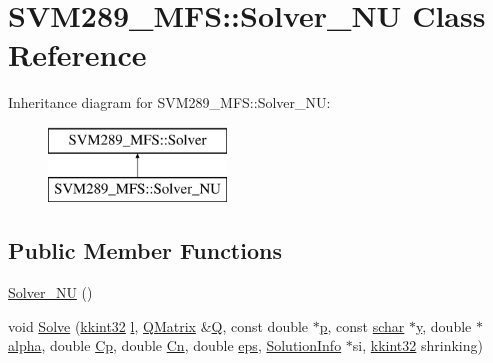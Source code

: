 \hypertarget{class_s_v_m289___m_f_s_1_1_solver___n_u}{}\section{S\+V\+M289\+\_\+\+M\+FS\+:\+:Solver\+\_\+\+NU Class Reference}
\label{class_s_v_m289___m_f_s_1_1_solver___n_u}
Inheritance diagram for S\+V\+M289\+\_\+\+M\+FS\+:\+:Solver\+\_\+\+NU\+:\begin{figure}[H]
\begin{center}
\leavevmode
\includegraphics[height=2.000000cm]{class_s_v_m289___m_f_s_1_1_solver___n_u}
\end{center}
\end{figure}
\subsection*{Public Member Functions}
\begin{DoxyCompactItemize}
\item 
\hyperlink{class_s_v_m289___m_f_s_1_1_solver___n_u_a2c623aebb6d4e9a955d24c313e854c68}{Solver\+\_\+\+NU} ()
\item 
void \hyperlink{class_s_v_m289___m_f_s_1_1_solver___n_u_a64010900d959a38e7385332c9e8b1790}{Solve} (\hyperlink{namespace_k_k_b_a8fa4952cc84fda1de4bec1fbdd8d5b1b}{kkint32} \hyperlink{class_s_v_m289___m_f_s_1_1_solver_a3b58f02675a93b7f559946c731beebd5}{l}, \hyperlink{class_s_v_m289___m_f_s_1_1_q_matrix}{Q\+Matrix} \&\hyperlink{class_s_v_m289___m_f_s_1_1_solver_a5655aaf1c92b609e8ed2087e08b053eb}{Q}, const double $\ast$\hyperlink{class_s_v_m289___m_f_s_1_1_solver_aee0ff21847e331b59d7a929b3c813b94}{p}, const \hyperlink{namespace_s_v_m289___m_f_s_a27545e8471784d831870feacd3e831ff}{schar} $\ast$\hyperlink{class_s_v_m289___m_f_s_1_1_solver_ab9586d6d550d7806b9582b9279217ff5}{y}, double $\ast$\hyperlink{class_s_v_m289___m_f_s_1_1_solver_a5a6158adccc034c04bdacf91e6bbb237}{alpha}, double \hyperlink{class_s_v_m289___m_f_s_1_1_solver_a951f59ea72f372f0e188c5815774fc6d}{Cp}, double \hyperlink{class_s_v_m289___m_f_s_1_1_solver_a56f6a320000a868937411fa4cfd458b5}{Cn}, double \hyperlink{class_s_v_m289___m_f_s_1_1_solver_afc19fe2ebf0ad2239f9f1c6db2d85c12}{eps}, \hyperlink{struct_s_v_m289___m_f_s_1_1_solver_1_1_solution_info}{Solution\+Info} $\ast$si, \hyperlink{namespace_k_k_b_a8fa4952cc84fda1de4bec1fbdd8d5b1b}{kkint32} shrinking)
\end{DoxyCompactItemize}
